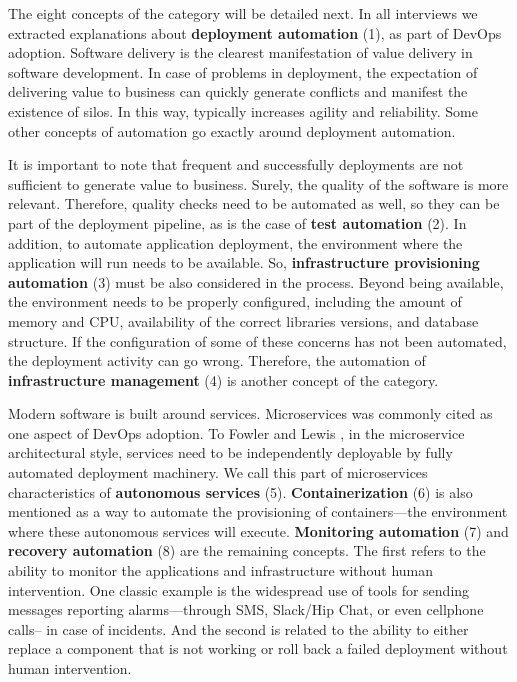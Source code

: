 
The eight concepts of the  category will be detailed next.
In all interviews we extracted explanations about \textbf{deployment
automation} (1), as part of DevOps adoption. Software delivery is the clearest
manifestation of value delivery in software development. In case of problems
in deployment, the expectation of delivering value to business can quickly
generate conflicts and manifest the existence of silos.
In this way,  typically increases agility and reliability. Some other
concepts of automation go exactly around deployment automation.

It is important to note that frequent and successfully
deployments are not sufficient to generate value to business. Surely, the quality of
the software is more relevant. Therefore, quality checks need to be automated as well, so they can be part of the
deployment pipeline, as is the case of \textbf{test automation} (2). In addition, to
automate application deployment, the environment where the
application will run needs to be available. So, \textbf{infrastructure
provisioning automation} (3) must be also considered in the process. Beyond being available,
the environment needs to be properly configured, including the amount of memory and CPU,
availability of the correct libraries versions, and database structure. If the configuration of some of these concerns
has not been automated, the deployment activity can go wrong. Therefore,
the automation of \textbf{infrastructure management} (4) is another
concept of the  category.

Modern software is built around services. Microservices  was commonly cited
as one aspect of DevOps adoption. To Fowler and Lewis
\cite{martinfowler2014microservices}, in the
microservice architectural style, services need to be independently deployable
by fully automated deployment machinery. We call this part of microservices
characteristics of \textbf{autonomous services} (5). \textbf{Containerization}
(6) is also mentioned as a way to automate the provisioning of containers---the
environment where these autonomous services will execute.
\textbf{Monitoring automation} (7) and \textbf{recovery automation} (8) are the
remaining concepts. The first refers to the ability to monitor the
applications and infrastructure without human intervention. One classic example
is the widespread use of tools for sending messages reporting
alarms---through SMS, Slack/Hip Chat, or even
cellphone calls-- in case of incidents. And the second is related to the ability
to either replace a component that is not working or
roll back a failed deployment without human intervention.

